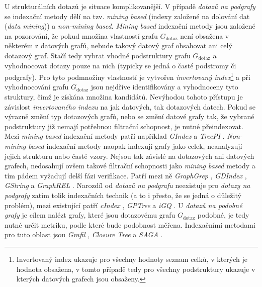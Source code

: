 U strukturálních dotazů je situace komplikovanější. V případě \textit{dotazů na podgrafy} se indexační metody dělí na tzv. \textit{mining based} (indexy založené na dolování dat (\textit{data mining})) a \textit{non-mining based}. \textit{Mining based} indexační metody jsou založené na pozorování, že pokud množina vlastností grafu \textit{$G_\mathrm{dotaz}$} není obsažena v některém z datových grafů, nebude takový datový graf obsahovat ani celý dotazový graf. Stačí tedy vybrat vhodné podstruktury grafu \textit{$G_\mathrm{dotaz}$} a vyhodnocovat dotazy pouze na nich (typicky se jedná o časté podstromy či podgrafy). Pro tyto podmnožiny vlastností je vytvořen \textit{invertovaný index}\footnote{Invertovaný index ukazuje pro všechny hodnoty seznam celků, v kterých je hodnota obsažena, v tomto případě tedy pro všechny podstruktury ukazuje v kterých datových grafech jsou obsaženy.} a při vyhodnocování grafu \textit{$G_\mathrm{dotaz}$} jsou nejdříve identifikovány a vyhodnoceny tyto struktury, čímž je získána množina kandidátů. Nevýhodou tohoto přístupu je závislost \textit{invertovaného indexu} na jak datových, tak dotazových datech. Pokud se výrazně změní typ dotazových grafů, nebo se změní datové grafy tak, že vybrané podstruktury již nemají potřebnou filtrační schopnost, je nutné přeindexovat. Mezi \textit{mining based} indexační metody patří například \textit{GIndex} \cite{Yan04} a \textit{TreePI} \cite{Zhang07}. \textit{Non-mining based} indexační metody naopak indexují grafy jako celek, neanalyzují jejich strukturu nabo časté vzory. Nejsou tak závislé na dotazových ani datových grafech, nedosahují ovšem takové filtrační schopnosti jako \textit{mining based} metody a tím pádem vyžadují delší fázi verifikace. Patří mezi ně \textit{GraphGrep} \cite{Giugno02}, \textit{GDIndex} \cite{Williams07}, \textit{GString} \cite{Jiang07} a \textit{GraphREL} \cite{Sakr09}. Narozdíl od \textit{dotazů na podgrafu} neexistuje pro \textit{dotazy na podgrafy} zatím tolik indexačních technik (a to i přesto, že se jedná o důležitý problém), mezi existující patří \textit{cIndex} \cite{Chen07}, \textit{GPTree} \cite{Zhang09} a \textit{iGQ} \cite{Wang16}. U \textit{dotazů na podobné grafy} je cílem nalézt grafy, které jsou dotazovému grafu \textit{$G_\mathrm{dotaz}$} podobné, je tedy nutné určit metriku, podle které bude podobnost měřena. Indexačními metodami pro tuto oblast jsou \textit{Grafil} \cite{Yan05}, \textit{Closure Tree} \cite{He06} a \textit{SAGA} \cite{Tian07}.

